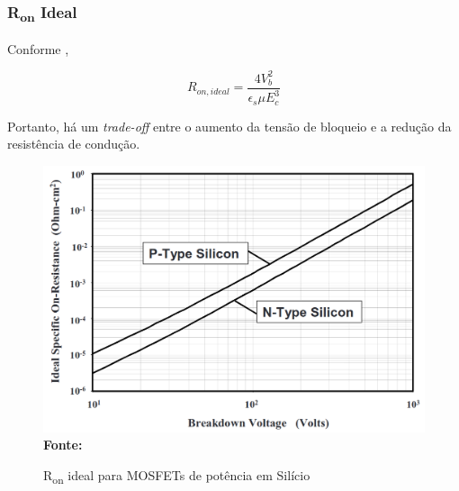 \begin{frame}

    \frametitle{{R\textsubscript{on} Ideal}}

    Conforme \cite{baliga2010fundamentals},

    \begin{equation}
        R_{on, ideal} = \frac{4V_b^2}{\epsilon_s\mu{}E_c^3}
    \end{equation}

    Portanto, há um \textit{trade-off} entre o aumento da tensão de bloqueio e a redução da resistência de condução.

\end{frame}

\begin{frame}
    
    \begin{figure}[!htbp]
        \centering
        \caption{R\textsubscript{on} ideal para MOSFETs de potência em Silício}
        \includegraphics[scale=0.2]{imagens/ronideal.png}
     \\\small{\textbf{Fonte:} \cite{baliga2010fundamentals}}%
  \end{figure}
  
\end{frame}
